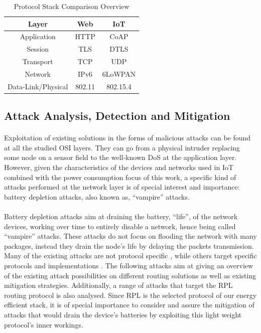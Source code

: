 \begin{table}[h]
	\centering
	\begin{center} \caption{Protocol Stack Comparison Overview } \label{tab:stack}\end{center}
	\begin{tabular}{c|c|c}
		Layer & Web & IoT \\
		\hline
		Application & \ac{HTTP} & \ac{CoAP} \\
		Session & \ac{TLS} & \ac{DTLS} \\
		Transport & \ac{TCP} & \ac{UDP} \\
		Network & IPv6 & 6LoWPAN \\
		Data-Link/Physical & 802.11 & 802.15.4
	\end{tabular}
\end{table}

\subsection{Attack Analysis, Detection and Mitigation}
\label{sec:attack_analysis}
\paragraph{}
Exploitation of existing solutions in the forms of malicious attacks can be found at all the studied OSI layers. They can go from a physical intruder replacing some node on a sensor field to the well-known \ac{DoS} at the application layer. However, given the characteristics of the devices and networks used in \ac{IoT} combined with the power consumption focus of this work, a specific kind of attacks performed at the network layer is of special interest and importance: battery depletion attacks, also known as, ``vampire'' attacks.

\paragraph{}
Battery depletion attacks aim at draining the battery, ``life'', of the network devices, working over time to entirely disable a network, hence being called ``vampire'' attacks. These attacks do not focus on flooding the network with many packages, instead they drain the node's life by delaying the packets transmission. Many of the existing attacks are not protocol specific \cite{Vasserman2013}, while others target specific protocols and implementations \cite{Pongle2015}. The following attacks aim at giving an overview of the existing attack possibilities on different routing solutions as well as existing mitigation strategies. Additionally, a range of attacks that target the RPL routing protocol is also analysed. Since RPL is the selected protocol of our energy efficient stack, it is of special importance to consider and assure the mitigation of attacks that would drain the device's batteries by exploiting this light weight protocol's inner workings.   

